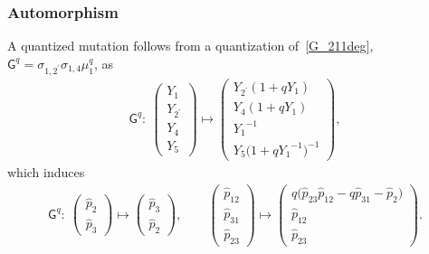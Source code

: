 \documentclass[pdftex]{sigma}
\numberwithin{equation}{section}
\begin{document}
\subsubsection*{Automorphism}
A quantized mutation follows from a quantization of~\eqref{G_211deg}, $\mathsf{G}^q=\sigma_{1,2^\prime} \sigma_{1,4} \mu^q_1$, as
\begin{gather*}
 \mathsf{G}^q\colon \
 \begin{pmatrix}
 Y_1 \\ Y_{2^\prime} \\ Y_4 \\ Y_5
 \end{pmatrix}
 \mapsto
 \begin{pmatrix}
 Y_{2^\prime} ( 1 + q Y_1) \\
 Y_4 ( 1 + q Y_1) \\
 {Y_1}^{-1} \\
 Y_5 \big( 1 + q {Y_1}^{-1} \big)^{-1}
 \end{pmatrix} ,
\end{gather*}
which induces
\begin{gather*}
 \mathsf{G}^q \colon \
 \begin{pmatrix}
 \hat{p}_2 \\
 \hat{p}_3
 \end{pmatrix}
 \mapsto
 \begin{pmatrix}
 \hat{p}_3 \\
 \hat{p}_2
 \end{pmatrix} , \qquad
 \begin{pmatrix}
 \hat{p}_{12} \\
 \hat{p}_{31} \\
 \hat{p}_{23}
 \end{pmatrix}
 \mapsto
 \begin{pmatrix}
 q \big( \hat{p}_{23} \hat{p}_{12} - q \hat{p}_{31} -\hat{p}_2 \big) \\
 \hat{p}_{12} \\
 \hat{p}_{23}
 \end{pmatrix} .
\end{gather*}
\end{document}
